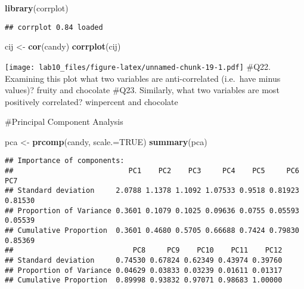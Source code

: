 \documentclass[
]{article}
\newenvironment{Shaded}{\begin{snugshade}}{\end{snugshade}}
\newcommand{\DataTypeTok}[1]{\textcolor[rgb]{0.13,0.29,0.53}{#1}}
\newcommand{\DecValTok}[1]{\textcolor[rgb]{0.00,0.00,0.81}{#1}}
\newcommand{\KeywordTok}[1]{\textcolor[rgb]{0.13,0.29,0.53}{\textbf{#1}}}
\newcommand{\NormalTok}[1]{#1}
\newcommand{\OperatorTok}[1]{\textcolor[rgb]{0.81,0.36,0.00}{\textbf{#1}}}
\newcommand{\OtherTok}[1]{\textcolor[rgb]{0.56,0.35,0.01}{#1}}
\newcommand{\StringTok}[1]{\textcolor[rgb]{0.31,0.60,0.02}{#1}}
\begin{document}
\begin{Shaded}
\begin{Highlighting}[]
\KeywordTok{library}\NormalTok{(corrplot)}
\end{Highlighting}
\end{Shaded}

\begin{verbatim}
## corrplot 0.84 loaded
\end{verbatim}

\begin{Shaded}
\begin{Highlighting}[]
\NormalTok{cij <-}\StringTok{ }\KeywordTok{cor}\NormalTok{(candy) }
\KeywordTok{corrplot}\NormalTok{(cij)}
\end{Highlighting}
\end{Shaded}

\texttt{[image: lab10\_files/figure-latex/unnamed-chunk-19-1.pdf]} \#Q22.
Examining this plot what two variables are anti-correlated (i.e.~have
minus values)? fruity and chocolate \#Q23. Similarly, what two variables
are most positively correlated? winpercent and chocolate

\#Principal Component Analysis

\begin{Shaded}
\begin{Highlighting}[]
\NormalTok{pca <-}\StringTok{ }\KeywordTok{prcomp}\NormalTok{(candy, }\DataTypeTok{scale.=}\OtherTok{TRUE}\NormalTok{) }
\KeywordTok{summary}\NormalTok{(pca)}
\end{Highlighting}
\end{Shaded}

\begin{verbatim}
## Importance of components:
##                           PC1    PC2    PC3     PC4    PC5     PC6     PC7
## Standard deviation     2.0788 1.1378 1.1092 1.07533 0.9518 0.81923 0.81530
## Proportion of Variance 0.3601 0.1079 0.1025 0.09636 0.0755 0.05593 0.05539
## Cumulative Proportion  0.3601 0.4680 0.5705 0.66688 0.7424 0.79830 0.85369
##                            PC8     PC9    PC10    PC11    PC12
## Standard deviation     0.74530 0.67824 0.62349 0.43974 0.39760
## Proportion of Variance 0.04629 0.03833 0.03239 0.01611 0.01317
## Cumulative Proportion  0.89998 0.93832 0.97071 0.98683 1.00000
\end{verbatim}

\begin{Shaded}
\end{Shaded}
\end{document}
